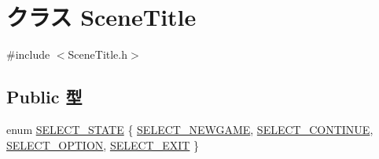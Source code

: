 \hypertarget{class_scene_title}{\section{クラス Scene\-Title}
\label{class_scene_title}
}


{\ttfamily \#include $<$Scene\-Title.\-h$>$}

\subsection*{Public 型}
\begin{DoxyCompactItemize}
\item 
enum \hyperlink{class_scene_title_adad72a30ae6ee6eb19e3b3f026112136}{S\-E\-L\-E\-C\-T\-\_\-\-S\-T\-A\-T\-E} \{ \hyperlink{class_scene_title_adad72a30ae6ee6eb19e3b3f026112136a0303cb2792f96bedf1f7494dd6d7f1d9}{S\-E\-L\-E\-C\-T\-\_\-\-N\-E\-W\-G\-A\-M\-E}, 
\hyperlink{class_scene_title_adad72a30ae6ee6eb19e3b3f026112136a53cded6606e90cec35da1b64fba814c2}{S\-E\-L\-E\-C\-T\-\_\-\-C\-O\-N\-T\-I\-N\-U\-E}, 
\hyperlink{class_scene_title_adad72a30ae6ee6eb19e3b3f026112136a117d0cf6ab7e922d3d5e80cc07563c52}{S\-E\-L\-E\-C\-T\-\_\-\-O\-P\-T\-I\-O\-N}, 
\hyperlink{class_scene_title_adad72a30ae6ee6eb19e3b3f026112136aba203bbde66e83d8b44047b99d478ade}{S\-E\-L\-E\-C\-T\-\_\-\-E\-X\-I\-T}
 \}
\end{DoxyCompactItemize}
